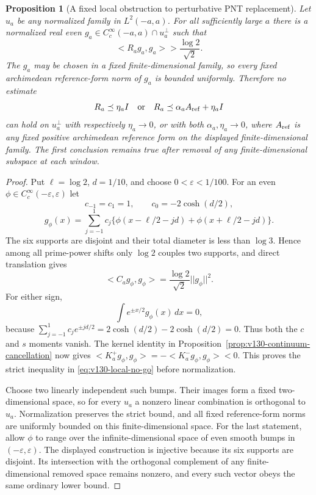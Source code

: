 \documentclass[11pt]{article}
\def\norm#1{||#1||}%
\def\ip#1#2{<#1,#2>}%
\newtheorem{proposition}[theorem]{Proposition}
\theoremstyle{remark}
\newcommand{\norm}[1]{\left\lVert #1\right\rVert}
\newcommand{\ip}[2]{\left\langle #1,#2\right\rangle}
\begin{document}
\begin{proposition}[A fixed local obstruction to perturbative PNT replacement]
\label{prop:v130-local-no-go}
Let $u_a$ be any normalized family in $L^2(-a,a)$. For all sufficiently
large $a$ there is a normalized real even
$g_a\in C_c^\infty(-a,a)\cap u_a^\perp$ such that
\begin{equation}\label{eq:v130-local-no-go}
 \ip{R_ag_a}{g_a}>\frac{\log2}{\sqrt2}.
\end{equation}
The $g_a$ may be chosen in a fixed finite-dimensional family, so every
fixed archimedean reference-form norm of $g_a$ is bounded uniformly.
Therefore no estimate
\[
 R_a\preceq\eta_a I
 \quad\hbox{or}\quad
 R_a\preceq\alpha_a A_{\rm ref}+\eta_a I
\]
can hold on $u_a^\perp$ with respectively $\eta_a\to0$, or with both
$\alpha_a,\eta_a\to0$, where $A_{\rm ref}$ is any fixed positive
archimedean reference form on the displayed finite-dimensional family.
The first conclusion remains true after removal of any
finite-dimensional subspace at each window.
\end{proposition}
\begin{proof}
Put $\ell=\log2$, $d=1/10$, and choose
$0<\varepsilon<1/100$. For an even
$\phi\in C_c^\infty(-\varepsilon,\varepsilon)$ let
\[
 c_{-1}=c_1=1,\qquad c_0=-2\cosh(d/2),
\]
\[
 g_\phi(x)=\sum_{j=-1}^1c_j
 \{\phi(x-\ell/2-jd)+\phi(x+\ell/2-jd)\}.
\]
The six supports are disjoint and their total diameter is less than
$\log3$. Hence among all prime-power shifts only $\log2$ couples two
supports, and direct translation gives
\[
 \ip{C_ag_\phi}{g_\phi}
   =\frac{\log2}{\sqrt2}\norm{g_\phi}^2.
\]
For either sign,
\[
 \int e^{\pm x/2}g_\phi(x)\,dx=0,
\]
because
$\sum_{j=-1}^1c_je^{\pm jd/2}
=2\cosh(d/2)-2\cosh(d/2)=0$.
Thus both the $c$ and $s$ moments vanish. The kernel identity in
Proposition~\ref{prop:v130-continuum-cancellation} now gives
$\ip{K_a^+g_\phi}{g_\phi}=-\ip{K_a^-g_\phi}{g_\phi}<0$.
This proves the strict inequality in \eqref{eq:v130-local-no-go}
before normalization.

Choose two linearly independent such bumps. Their images form a fixed
two-dimensional space, so for every $u_a$ a nonzero linear combination
is orthogonal to $u_a$. Normalization preserves the strict bound, and
all fixed reference-form norms are uniformly bounded on this
finite-dimensional space. For the last statement, allow $\phi$ to
range over the infinite-dimensional space of even smooth bumps in
$(-\varepsilon,\varepsilon)$. The displayed construction is injective
because its six supports are disjoint. Its intersection with the
orthogonal complement of any finite-dimensional removed space remains
nonzero, and every such vector obeys the same ordinary lower bound.
\end{proof}
\end{document}
